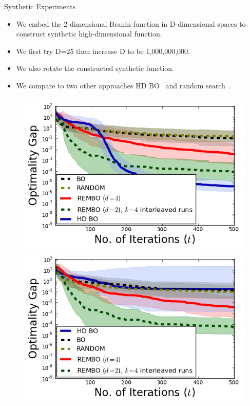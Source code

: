 \documentclass[final]{beamer}
\begin{document}
\begin{frame}[t]
\begin{columns}[T]
\begin{column}{.48\textwidth}
\begin{block}{Synthetic Experiments}

  \begin{itemize}
   \item We embed the 2-dimensional Branin function in D-dimensional spaces to 
   construct synthetic high-dimensional function.
   \item We first try D=25 then increase D to be 1,000,000,000.
   \item We also rotate the constructed synthetic function.
   \item We compare to two other approaches HD BO~\cite{chen:2012} and random search~\cite{Bergstra:2012}.
  \end{itemize}
  
\begin{figure}[t!]
  \includegraphics[scale=0.9]{../paper/figures/branin_dis_25.png}
  \includegraphics[scale=0.9]{../paper/figures/branin_dis_rot.png}

\end{figure}
\end{block}
\end{column}
\end{columns}
\end{frame}
\end{document}
